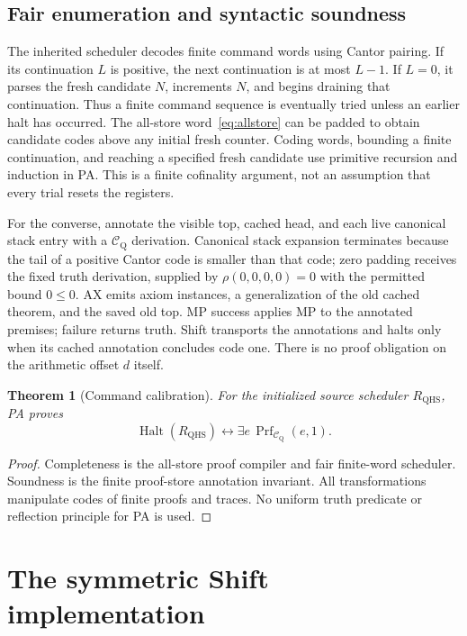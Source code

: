 \documentclass[11pt,letterpaper]{article}
\newcommand{\Prf}{\operatorname{Prf}}
\newcommand{\Halt}{\operatorname{Halt}}
\newcommand{\CQ}{\mathcal C_{\mathrm Q}}
\newtheorem{theorem}{Theorem}[section]
\begin{document}
\subsection{Fair enumeration and syntactic soundness}

The inherited scheduler decodes finite command words using Cantor
pairing. If its continuation $L$ is positive, the next continuation is
at most $L-1$. If $L=0$, it parses the fresh candidate $N$, increments
$N$, and begins draining that continuation. Thus a finite command
sequence is eventually tried unless an earlier halt has occurred.
The all-store word~\eqref{eq:allstore} can be padded to obtain candidate
codes above any initial fresh counter. Coding words, bounding a finite
continuation, and reaching a specified fresh candidate use primitive
recursion and induction in PA. This is a finite cofinality argument,
not an assumption that every trial resets the registers.

For the converse, annotate the visible top, cached head, and each live
canonical stack entry with a $\CQ$ derivation. Canonical stack expansion
terminates because the tail of a positive Cantor code is smaller than
that code; zero padding receives the fixed truth derivation, supplied by
$\rho(0,0,0,0)=0$ with the permitted bound $0\le0$. AX emits
axiom instances, a generalization of the old cached theorem, and the
saved old top. MP success applies MP to the annotated premises; failure
returns truth. Shift transports the annotations and halts only when
its cached annotation concludes code one. There is no proof obligation
on the arithmetic offset $d$ itself.

\begin{theorem}[Command calibration]\label{thm:commands}
For the initialized source scheduler $R_{\mathrm{QHS}}$, PA proves
\[
 \Halt(R_{\mathrm{QHS}})\leftrightarrow
              \exists e\,\Prf_{\CQ}(e,1).
\]
\end{theorem}
\begin{proof}
Completeness is the all-store proof compiler and fair finite-word
scheduler. Soundness is the finite proof-store annotation invariant.
All transformations manipulate codes of finite proofs and traces.
No uniform truth predicate or reflection principle for PA is used.
\end{proof}

\section{The symmetric Shift implementation}\label{sec:symmetric}
\end{document}
